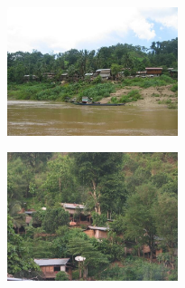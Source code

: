 \begin{multicols}{2}
\smallbreak
\hspace*{-0.65cm}
\includegraphics[width=5cm]{articles/Mekong/1214473400ezNu.jpg}
\smallbreak

\smallbreak
\hspace*{-0.65cm}
\includegraphics[width=5cm]{articles/Mekong/1214473407uNUm.jpg}
\smallbreak

\end{multicols}


